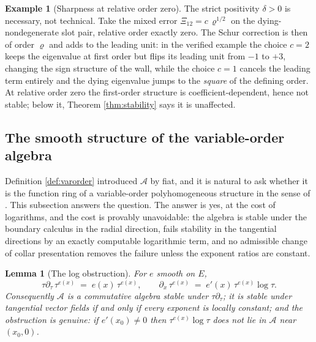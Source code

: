 \documentclass[11pt]{article}
\newtheorem{lemma}[theorem]{Lemma}
\theoremstyle{definition}
\newtheorem{example}[theorem]{Example}
\begin{document}
\begin{example}[Sharpness at relative order zero]\label{ex:sharp}
The strict positivity $\delta > 0$ is necessary, not technical. Take the mixed error $\Xi_{12} = c\,\varrho^{1/2}$ on the dying-nondegenerate slot pair, relative order exactly zero. The Schur correction is then of order $\varrho$ and adds to the leading unit: in the verified example the choice $c = 2$ keeps the eigenvalue at first order but flips its leading unit from $-1$ to $+3$, changing the sign structure of the wall, while the choice $c = 1$ cancels the leading term entirely and the dying eigenvalue jumps to the \emph{square} of the defining order. At relative order zero the first-order structure is coefficient-dependent, hence not stable; below it, Theorem \ref{thm:stability} says it is unaffected.
\end{example}

\subsection{The smooth structure of the variable-order algebra}\label{subsec:smoothstructure}

Definition \ref{def:varorder} introduced $\mathcal{A}$ by fiat, and it is natural to ask whether it is the function ring of a variable-order polyhomogeneous structure in the sense of \cite{Melrose1993}. This subsection answers the question. The answer is yes, at the cost of logarithms, and the cost is provably unavoidable: the algebra is stable under the boundary calculus in the radial direction, fails stability in the tangential directions by an exactly computable logarithmic term, and no admissible change of collar presentation removes the failure unless the exponent ratios are constant.

\begin{lemma}[The log obstruction]\label{lem:logobstruction}
For $e$ smooth on $E$,
\[
\tau\partial_\tau\,\tau^{e(x)} \;=\; e(x)\,\tau^{e(x)},
\qquad
\partial_x\,\tau^{e(x)} \;=\; e'(x)\,\tau^{e(x)}\log\tau .
\]
Consequently $\mathcal{A}$ is a commutative algebra stable under $\tau\partial_\tau$; it is stable under tangential vector fields if and only if every exponent is locally constant; and the obstruction is genuine: if $e'(x_0) \neq 0$ then $\tau^{e(x)}\log\tau$ does not lie in $\mathcal{A}$ near $(x_0,0)$.
\end{lemma}
\end{document}
